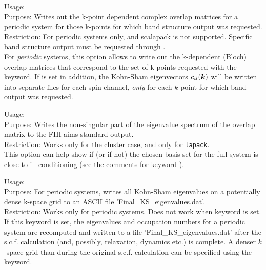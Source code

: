 {
  \noindent
  Usage:   \\[1.0ex]
  Purpose: Writes out the k-point dependent complex overlap matrices
    for a periodic system for those k-points for which band structure
    output was requested. \\[1.0ex]
  Restriction: For periodic systems only, and scalapack is not
  supported. Specific band structure output must be requested through
   . \\[1.0ex]
}
For \emph{periodic} systems, this option allows to write out the
k-dependent (Bloch) overlap matrices that correspond to the set of
k-points requested with the  
keyword. If   is set in
addition, the Kohn-Sham eigenvectors $c_{il}(\mbox{\boldmath$k$})$ will be
written into separate files for each spin channel, \emph{only} for each
$k$-point for which band output was requested.

{
  \noindent
  Usage:   \\[1.0ex]
  Purpose: Writes the non-singular part of the eigenvalue spectrum of
    the overlap matrix to the FHI-aims standard output. \\[1.0ex]
  Restriction: Works only for the cluster case, and only for
     \texttt{lapack}. \\[1.0ex]
}
This option can help show if (or if not) the chosen basis set for the full
system is close to ill-conditioning (see the comments for keyword
).

{
  \noindent
  Usage:   \\[1.0ex]
  Purpose: For periodic systems, writes all Kohn-Sham eigenvalues on a
    potentially dense k-space grid to an ASCII file 'Final\_KS\_eigenvalues.dat'. \\[1.0ex]
  Restriction: Works only for periodic systems. Does not work when keyword
     is set. \\[1.0ex]
}
If this keyword is set, the eigenvalues and occupation numbers for a periodic system are
recomputed and written to a file 'Final\_KS\_eigenvalues.dat' after the s.c.f. calculation
(and, possibly, relaxation, dynamics etc.) is complete. A denser $k$-space grid than during
the original s.c.f. calculation can be specified using the  keyword.

